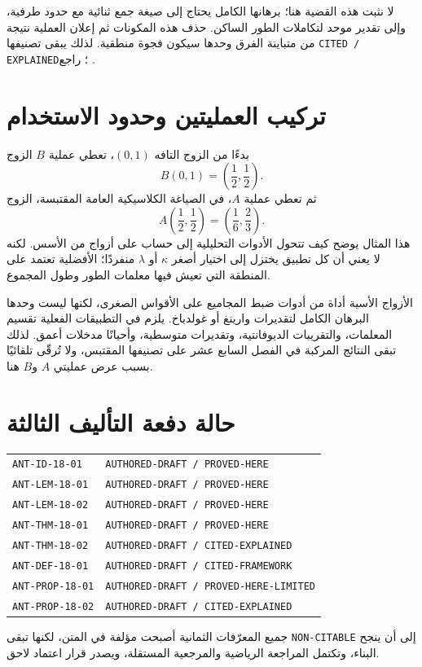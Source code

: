 لا نثبت هذه القضية هنا؛ برهانها الكامل يحتاج إلى صيغة جمع ثنائية مع حدود طرفية، وإلى تقدير موحد لتكاملات الطور الساكن. حذف هذه المكونات ثم إعلان العملية نتيجة من متباينة الفرق وحدها سيكون فجوة منطقية. لذلك يبقى تصنيفها \texttt{CITED / EXPLAINED}؛ راجع \cite[الفصل~3، الصفحات~21--37]{GrahamKolesnik1991}.

\section{تركيب العمليتين وحدود الاستخدام}

بدءًا من الزوج التافه \((0,1)\)، تعطي عملية \(B\) الزوج
\[
B(0,1)=\left(\frac12,\frac12\right).
\]
ثم تعطي عملية \(A\)، في الصياغة الكلاسيكية العامة المقتبسة، الزوج
\[
A\left(\frac12,\frac12\right)
=
\left(\frac16,\frac23\right).
\]
هذا المثال يوضح كيف تتحول الأدوات التحليلية إلى حساب على أزواج من الأسس. لكنه لا يعني أن كل تطبيق يختزل إلى اختيار أصغر \(\kappa\) أو \(\lambda\) منفردًا؛ الأفضلية تعتمد على المنطقة التي تعيش فيها معلمات الطور وطول المجموع.

\begin{remark}
الأزواج الأسية أداة من أدوات ضبط المجاميع على الأقواس الصغرى، لكنها ليست وحدها البرهان الكامل لتقديرات وارينغ أو غولدباخ. يلزم في التطبيقات الفعلية تقسيم المعلمات، والتقريبات الديوفانتية، وتقديرات متوسطية، وأحيانًا مدخلات أعمق. لذلك تبقى النتائج المركبة في الفصل السابع عشر على تصنيفها المقتبس، ولا تُرقّى تلقائيًا بسبب عرض عمليتي \(A\) و\(B\) هنا.
\end{remark}

\section*{حالة دفعة التأليف الثالثة}

\begin{center}
\begin{tabular}{ll}
\texttt{ANT-ID-18-01} & \texttt{AUTHORED-DRAFT / PROVED-HERE}\\
\texttt{ANT-LEM-18-01} & \texttt{AUTHORED-DRAFT / PROVED-HERE}\\
\texttt{ANT-LEM-18-02} & \texttt{AUTHORED-DRAFT / PROVED-HERE}\\
\texttt{ANT-THM-18-01} & \texttt{AUTHORED-DRAFT / PROVED-HERE}\\
\texttt{ANT-THM-18-02} & \texttt{AUTHORED-DRAFT / CITED-EXPLAINED}\\
\texttt{ANT-DEF-18-01} & \texttt{AUTHORED-DRAFT / CITED-FRAMEWORK}\\
\texttt{ANT-PROP-18-01} & \texttt{AUTHORED-DRAFT / PROVED-HERE-LIMITED}\\
\texttt{ANT-PROP-18-02} & \texttt{AUTHORED-DRAFT / CITED-EXPLAINED}
\end{tabular}
\end{center}

جميع المعرّفات الثمانية أصبحت مؤلفة في المتن، لكنها تبقى \texttt{NON-CITABLE} إلى أن ينجح البناء، وتكتمل المراجعة الرياضية والمرجعية المستقلة، ويصدر قرار اعتماد لاحق.
